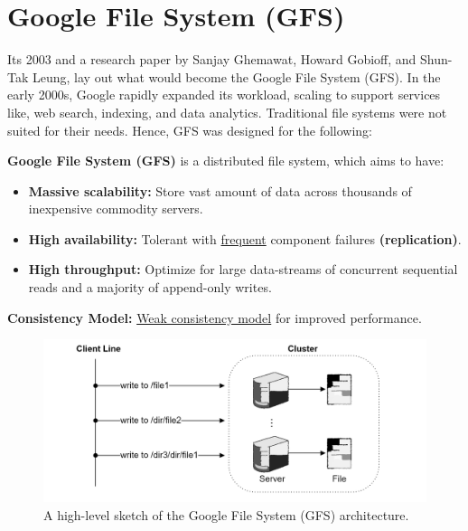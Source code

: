 \newpage 
\section{Google File System (GFS)}

Its 2003 and a research paper by Sanjay Ghemawat, Howard Gobioff, and Shun-Tak Leung, lay out
what would become the Google File System (GFS). In the early 2000s,
Google rapidly expanded its workload, scaling to support services like,
web search, indexing, and data analytics. Traditional file 
systems were not suited for their needs. Hence, GFS was designed for the following:

\begin{Def}
  
  \textbf{Google File System (GFS)} is a distributed file system, which aims to have:
  \begin{itemize}
    \item \textbf{Massive scalability:} Store vast amount of data across thousands of inexpensive commodity servers.
    \item \textbf{High availability:} Tolerant with \underline{frequent} component failures \textbf{(replication)}.
    \item \textbf{High throughput:} Optimize for large data-streams of concurrent sequential reads and a majority of append-only writes.
  \end{itemize}

  \noindent
  \textbf{Consistency Model:} \underline{Weak consistency model} for improved performance.
\end{Def}

\vspace{1em}
\begin{figure}[h]
  \centering
  \includegraphics[width=\textwidth]{Sections/gfs/gfs.png}
  \caption{A high-level sketch of the Google File System (GFS) architecture.}
  \label{fig:gfs-architecture}

\end{figure}

